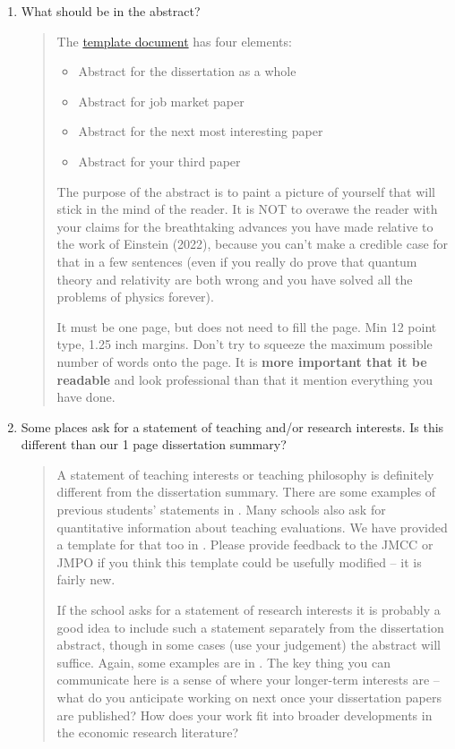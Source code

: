 \documentclass{\classes/econtex}
\begin{document}
\begin{enumerate}
\begin{quote}
  \end{quote}

\item  What should be in the abstract?
  \begin{quote}
    The \href{\templatesbloburl/moniker-dir-make/Abstract.tex}{template document} has four elements:
    \begin{itemize}
    \item Abstract for the dissertation as a whole
    \item Abstract for job market paper
    \item Abstract for the next most interesting paper
    \item Abstract for your third paper
    \end{itemize}

    The purpose of the abstract is to paint a picture of yourself that will stick in the mind of the reader.  It is NOT to overawe the reader with your claims for the breathtaking advances you have made relative to the work of Einstein (2022), because you can't make a credible case for that in a few sentences (even if you really do prove that quantum theory and relativity are both wrong and you have solved all the problems of physics forever).

    It must be one page, but does not need to fill the page.  Min 12 point type, 1.25 inch margins.  Don't try to squeeze the maximum possible number of words onto the page.  It is \textbf{more important that it be readable} and look professional than that it mention everything you have done.

  \end{quote}

\item  Some places ask for a statement of teaching and/or research
  interests.  Is this different than our 1 page
  dissertation summary?

  \begin{quote}
    A statement of teaching interests or teaching philosophy is
    definitely different from the dissertation summary.  There are some
    examples of previous students' statements in \Resources.  Many
    schools also ask for quantitative information about teaching
    evaluations.  We have provided a template for that too in
    \Templates.  Please provide feedback to the JMCC or JMPO if you
    think this template could be usefully modified -- it is fairly new.

    If the school asks for a statement of research interests it is probably
    a good idea to include such a statement separately from the dissertation
    abstract, though in some cases (use your judgement) the abstract will suffice.  Again, some examples are in \Resources.  
    The key thing you can communicate here is a sense of where your longer-term 
    interests are -- what do you anticipate working on next once your dissertation
    papers are published?  How does your work fit into broader developments in 
    the economic research literature?


\end{quote}
\end{enumerate}
\end{document}
